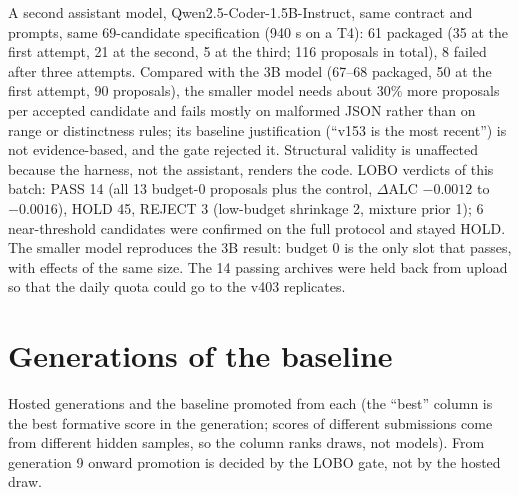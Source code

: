 \documentclass{article}
\begin{document}
A second assistant model, Qwen2.5-Coder-1.5B-Instruct, same contract and prompts, same 69-candidate specification (940 s on a T4): 61 packaged (35 at the first attempt, 21 at the second, 5 at the third; 116 proposals in total), 8 failed after three attempts. Compared with the 3B model (67--68 packaged, 50 at the first attempt, 90 proposals), the smaller model needs about 30\% more proposals per accepted candidate and fails mostly on malformed JSON rather than on range or distinctness rules; its baseline justification (``v153 is the most recent'') is not evidence-based, and the gate rejected it. Structural validity is unaffected because the harness, not the assistant, renders the code. LOBO verdicts of this batch: PASS 14 (all 13 budget-0 proposals plus the control, $\Delta\text{ALC}$ $-0.0012$ to $-0.0016$), HOLD 45, REJECT 3 (low-budget shrinkage 2, mixture prior 1); 6 near-threshold candidates were confirmed on the full protocol and stayed HOLD. The smaller model reproduces the 3B result: budget 0 is the only slot that passes, with effects of the same size. The 14 passing archives were held back from upload so that the daily quota could go to the v403 replicates.

\section{Generations of the baseline}
\label{app:generations}
Hosted generations and the baseline promoted from each (the ``best'' column is the best formative score in the generation; scores of different submissions come from different hidden samples, so the column ranks draws, not models). From generation 9 onward promotion is decided by the LOBO gate, not by the hosted draw.
\end{document}
